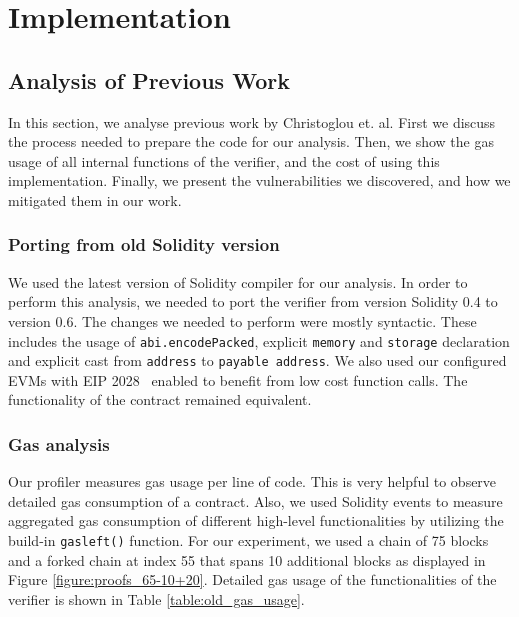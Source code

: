 \chapter{Implementation}



\section{Analysis of Previous Work}

In this section, we analyse previous work by Christoglou et. al. First we
discuss the process needed to prepare the code for our analysis. Then, we show
the gas usage of all internal functions of the verifier, and the cost of using
this implementation. Finally, we present the vulnerabilities we discovered, and
how we mitigated them in our work.

\subsection{Porting from old Solidity version}

We used the latest version of Solidity compiler for our analysis. In order to
perform this analysis, we needed to port the verifier from version Solidity 0.4
to version 0.6. The changes we needed to perform were mostly syntactic. These
includes the usage of \texttt{abi.encodePacked}, explicit \texttt{memory} and
\texttt{storage} declaration and explicit cast from \texttt{address} to
\texttt{payable address}. We also used our configured EVMs with EIP
2028~\cite{EIP2028} enabled to benefit from low cost function calls. The
functionality of the contract remained equivalent.

\subsection{Gas analysis}

Our profiler measures gas usage per line of code. This is very helpful to
observe detailed gas consumption of a contract. Also, we used Solidity events
to measure aggregated gas consumption of different high-level functionalities
by utilizing the build-in \texttt{gasleft()} function. For our experiment, we
used a chain of 75 blocks and a forked chain at index 55 that spans 10
additional blocks as displayed in Figure \ref{figure:proofs_65-10+20}. Detailed
gas usage of the functionalities of the verifier is shown in Table
\ref{table:old_gas_usage}.


